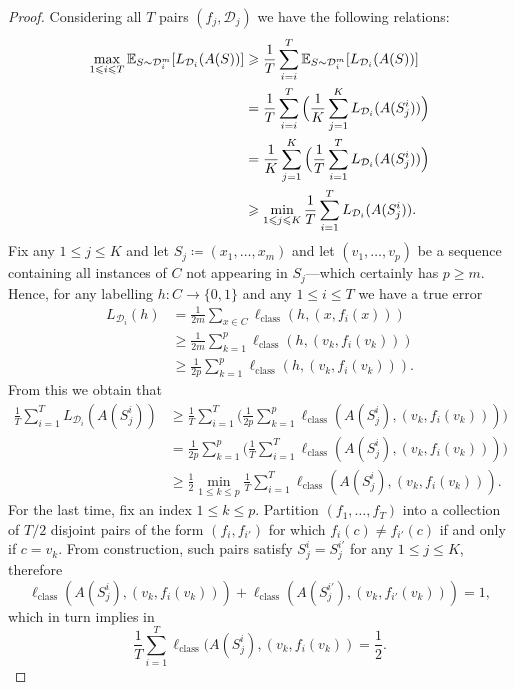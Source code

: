 \begin{proof}
Considering all \(T\) pairs \((f_j, \mathcal{D}_j)\) we have the following
relations:
\begin{align}\label{eq:nfl-max-i-in-T}
  \nonumber
  \max_{1 \leqslant i \leqslant T} \operatorname{\mathbb{E}}_{S \sim \mathcal{D}_i^m}[L_{\mathcal{D}_i}(A(S))]
  &\geqslant \frac{1}{T} \sum_{i=i}^{T} \operatorname{\mathbb{E}}_{S \sim \mathcal{D}_i^m}[L_{\mathcal{D}_i}(A(S))]
  \\
  \nonumber
  &= \frac{1}{T} \sum_{i=i}^{T} \Big(
    \frac{1}{K} \sum_{j=1}^K L_{\mathcal{D}_i}(A(S_j^i))
    \Big) \\
  \nonumber
  &= \frac{1}{K} \sum_{j=1}^{K} \Big(
    \frac{1}{T} \sum_{i=1}^T L_{\mathcal{D}_i}(A(S_j^i))
    \Big) \\
  &\geqslant \min_{1 \leqslant j \leqslant K} \frac{1}{T} \sum_{i=1}^T L_{\mathcal{D}_i}(A(S_j^i)).
\end{align}
Fix any \(1 \leq j \leq K\) and let \(S_j \coloneq (x_1, \dots, x_m)\) and let
\((v_1, \dots, v_p)\) be a sequence containing all instances of \(C\) not
appearing in \(S_j\)---which certainly has \(p \geq m\). Hence, for any
labelling \(h: C \to \{0, 1\}\) and any \(1 \leq i \leq T\) we have a true error
\begin{align*}
L_{\mathcal{D}_i}(h)
&= \frac{1}{2m} \sum_{x \in C} \ell_{\text{class}}(h, (x, f_i(x))) \\
&\geq \frac{1}{2 m} \sum_{k=1}^p \ell_{\text{class}}(h, (v_k, f_i(v_k))) \\
&\geq \frac{1}{2 p} \sum_{k=1}^p \ell_{\text{class}}(h, (v_k, f_i(v_k))).
\end{align*}
From this we obtain that
\begin{align}\label{eq:nfl-avg-true-loss-T}
  \nonumber
  \frac{1}{T} \sum_{i=1}^T L_{\mathcal{D}_i}(A(S_j^i))
  &\geq \frac{1}{T} \sum_{i=1}^T \Big(
    \frac{1}{2 p} \sum_{k=1}^p \ell_{\text{class}}(A(S_j^i), (v_k, f_i(v_k)))
    \Big) \\
  \nonumber
  &= \frac{1}{2 p} \sum_{k=1}^p \Big(
    \frac{1}{T} \sum_{i=1}^T \ell_{\text{class}}(A(S_j^i), (v_k, f_i(v_k)))
    \Big) \\
  &\geq \frac{1}{2} \min_{1 \leq k \leq p} \frac{1}{T}
    \sum_{i=1}^T \ell_{\text{class}}(A(S_j^i), (v_k, f_i(v_k))).
\end{align}
For the last time, fix an index \(1 \leq k \leq p\). Partition \((f_1, \dots,
f_T)\) into a collection of \(T/2\) disjoint pairs of the form \((f_i, f_{i'})\)
for which \(f_i(c) \neq f_{i'}(c)\) if and only if \(c = v_k\). From
construction, such pairs satisfy \(S_j^i = S_j^{i'}\) for any \(1 \leq j \leq
K\), therefore
\[
\ell_{\text{class}}(A(S_j^i), (v_k, f_i(v_k)))
+ \ell_{\text{class}}(A(S_j^{i'}), (v_k, f_{i'}(v_k)))
= 1,
\]
which in turn implies in
\begin{equation}\label{eq:nfl-avg-T-is-half}
\frac{1}{T} \sum_{i=1}^T \ell_{\text{class}}(A(S_j^i), (v_k, f_i(v_k)) = \frac{1}{2}.
\end{equation}


\end{proof}
